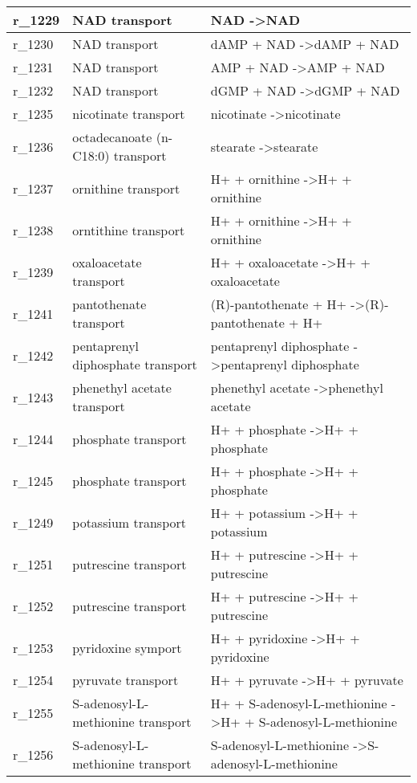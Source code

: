 \begin{landscape}
{\begin{longtable}{|l|p{7cm}|p{15cm}|}
r\_1229 & NAD transport & NAD  -\textgreater NAD \\ \hline
r\_1230 & NAD transport & dAMP + NAD  -\textgreater dAMP + NAD \\ \hline
r\_1231 & NAD transport & AMP + NAD  -\textgreater AMP + NAD \\ \hline
r\_1232 & NAD transport & dGMP + NAD  -\textgreater dGMP + NAD \\ \hline
r\_1235 & nicotinate transport & nicotinate  -\textgreater nicotinate \\ \hline
r\_1236 & octadecanoate (n-C18:0) transport & stearate  -\textgreater stearate \\ \hline
r\_1237 & ornithine transport & H+ + ornithine  -\textgreater H+ + ornithine \\ \hline
r\_1238 & orntithine transport & H+ + ornithine  -\textgreater H+ + ornithine \\ \hline
r\_1239 & oxaloacetate transport & H+ + oxaloacetate  -\textgreater H+ + oxaloacetate \\ \hline
r\_1241 & pantothenate transport & (R)-pantothenate + H+  -\textgreater (R)-pantothenate + H+ \\ \hline
r\_1242 & pentaprenyl diphosphate transport & pentaprenyl diphosphate  -\textgreater pentaprenyl diphosphate \\ \hline
r\_1243 & phenethyl acetate transport & phenethyl acetate  -\textgreater phenethyl acetate \\ \hline
r\_1244 & phosphate transport & H+ + phosphate  -\textgreater H+ + phosphate \\ \hline
r\_1245 & phosphate transport & H+ + phosphate  -\textgreater H+ + phosphate \\ \hline
r\_1249 & potassium transport & H+ + potassium  -\textgreater H+ + potassium \\ \hline
r\_1251 & putrescine transport & H+ + putrescine  -\textgreater H+ + putrescine \\ \hline
r\_1252 & putrescine transport & H+ + putrescine  -\textgreater H+ + putrescine \\ \hline
r\_1253 & pyridoxine symport & H+ + pyridoxine  -\textgreater H+ + pyridoxine \\ \hline
r\_1254 & pyruvate transport & H+ + pyruvate  -\textgreater H+ + pyruvate \\ \hline
r\_1255 & S-adenosyl-L-methionine transport & H+ + S-adenosyl-L-methionine  -\textgreater H+ + S-adenosyl-L-methionine \\ \hline
r\_1256 & S-adenosyl-L-methionine transport & S-adenosyl-L-methionine  -\textgreater S-adenosyl-L-methionine \\ \hline

\end{longtable}}
\end{landscape}
